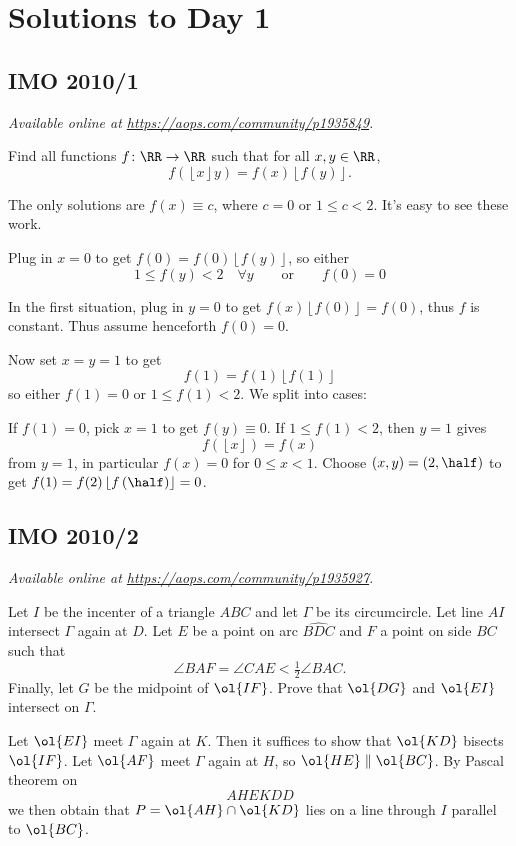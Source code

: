 \documentclass[11pt]{scrartcl}
\begin{document}
\section{Solutions to Day 1}
\subsection{IMO 2010/1}
\textsl{Available online at \url{https://aops.com/community/p1935849}.}
\begin{mdframed}[style=mdpurplebox,frametitle={Problem statement}]
Find all functions $f \colon \RR \to \RR$
such that for all $x,y \in \RR$,
\[ f(\left\lfloor x\right\rfloor y)
  = f(x)\left\lfloor f(y)\right\rfloor. \]
\end{mdframed}
The only solutions are $f(x) \equiv c$,
where $c = 0$ or $1 \le c < 2$.
It's easy to see these work.

Plug in $x=0$ to get $f(0) = f(0) \left\lfloor f(y) \right\rfloor$,
so either
\[ 1 \le f(y) < 2 \quad \forall y
  \qquad\text{or}\qquad f(0) = 0 \]

In the first situation,
plug in $y=0$ to get $f(x) \left\lfloor f(0) \right\rfloor = f(0)$,
thus $f$ is constant.
Thus assume henceforth $f(0) = 0$.

Now set $x=y=1$ to get
\[ f(1) = f(1) \left\lfloor f(1) \right\rfloor \]
so either $f(1) = 0$ or $1 \le f(1) < 2$.
We split into cases:
\begin{itemize}
  \ii If $f(1) = 0$, pick $x=1$ to get $f(y) \equiv 0$.
  \ii If $1 \le f(1) < 2$,
  then $y=1$ gives
  \[ f(\left\lfloor x \right\rfloor) = f(x) \]
  from $y=1$, in particular $f(x) = 0$ for $0 \le x < 1$.
  Choose $(x,y) = \left( 2, \half \right)$ to get
  $f(1) = f(2) \left\lfloor f\left( \half \right) \right\rfloor = 0$.
\end{itemize}
\pagebreak

\subsection{IMO 2010/2}
\textsl{Available online at \url{https://aops.com/community/p1935927}.}
\begin{mdframed}[style=mdpurplebox,frametitle={Problem statement}]
Let $I$ be the incenter of a triangle $ABC$ and let $\Gamma$ be its circumcircle.
Let line $AI$ intersect $\Gamma$ again at $D$.
Let $E$ be a point on arc $\widehat{BDC}$ and $F$ a point on side $BC$ such that
\[ \angle BAF = \angle CAE < \tfrac12 \angle BAC. \]
Finally, let $G$ be the midpoint of $\ol{IF}$.
Prove that $\ol{DG}$ and $\ol{EI}$ intersect on $\Gamma$.
\end{mdframed}
Let $\ol{EI}$ meet $\Gamma$ again at $K$.
Then it suffices to show that $\ol{KD}$ bisects $\ol{IF}$.
Let $\ol{AF}$ meet $\Gamma$ again at $H$, so $\ol{HE} \parallel \ol{BC}$.
By Pascal theorem on \[ AHEKDD \]
we then obtain that $P = \ol{AH} \cap \ol{KD}$ lies on a line through $I$
parallel to $\ol{BC}$.
\end{document}
